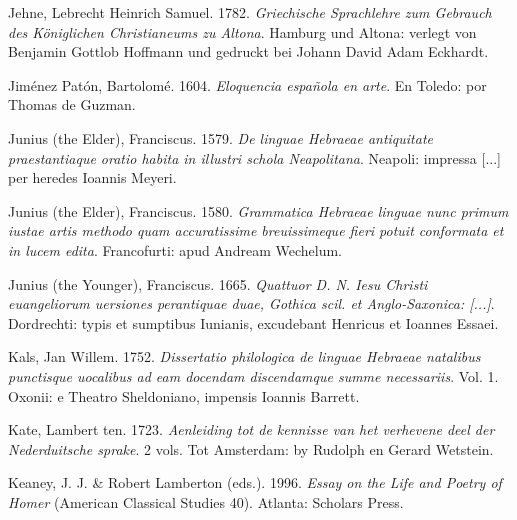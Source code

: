 \begin{styleStandard}
Jehne, Lebrecht Heinrich Samuel. 1782. \textit{Griechische Sprachlehre zum Gebrauch des Königlichen Christianeums zu Altona}. Hamburg und Altona: verlegt von Benjamin Gottlob Hoffmann und gedruckt bei Johann David Adam Eckhardt.
\end{styleStandard}

\begin{styleStandard}
Jiménez Patón, Bartolomé. 1604. \textit{Eloquencia española en arte}. En Toledo: por Thomas de Guzman.
\end{styleStandard}

\begin{styleStandard}
Junius (the Elder), Franciscus. 1579. \textit{De linguae Hebraeae antiquitate praestantiaque oratio habita in illustri schola Neapolitana}. Neapoli: impressa [...] per heredes Ioannis Meyeri.
\end{styleStandard}

\begin{styleStandard}
Junius (the Elder), Franciscus. 1580. \textit{Grammatica Hebraeae linguae nunc primum iustae artis methodo quam accuratissime breuissimeque fieri potuit conformata et in lucem edita}. Francofurti: apud Andream Wechelum.
\end{styleStandard}

\begin{styleStandard}
Junius (the Younger), Franciscus. 1665. \textit{Quattuor D. N. Iesu Christi euangeliorum uersiones perantiquae duae, Gothica scil. et Anglo-Saxonica: [...]}. Dordrechti: typis et sumptibus Iunianis, excudebant Henricus et Ioannes Essaei.
\end{styleStandard}

\begin{styleStandard}
Kals, Jan Willem. 1752. \textit{Dissertatio philologica de linguae Hebraeae natalibus punctisque uocalibus ad eam docendam discendamque summe necessariis}. Vol. 1. Oxonii: e Theatro Sheldoniano, impensis Ioannis Barrett.
\end{styleStandard}

\begin{styleStandard}
Kate, Lambert ten. 1723. \textit{Aenleiding tot de kennisse van het verhevene deel der Nederduitsche sprake}. 2 vols. Tot Amsterdam: by Rudolph en Gerard Wetstein.
\end{styleStandard}

\begin{styleStandard}
Keaney, J. J. \& Robert Lamberton (eds.). 1996. \textit{Essay on the Life and Poetry of Homer} (American Classical Studies 40). Atlanta: Scholars Press.
\end{styleStandard}

